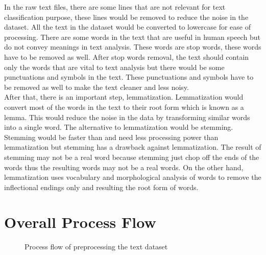 In the raw text files, there are some lines that are not relevant for text classification purpose, these lines would be removed to reduce the noise in the dataset. All the text in the dataset would be converted to lowercase for ease of processing. There are some words in the text that are useful in human speech but do not convey meanings in text analysis. These words are stop words, these words have to be removed as well. After stop words removal, the text should contain only the words that are vital to text analysis but there would be some punctuations and symbols in the text. These punctuations and symbols have to be removed as well to make the text cleaner and less noisy.\\

After that, there is an important step, lemmatization. Lemmatization would convert most of the words in the text to their root form which is known as a lemma. This would reduce the noise in the data by transforming similar words into a single word. The alternative to lemmatization would be stemming. Stemming would be faster than and need less processing power than lemmatization but stemming has a drawback against lemmatization. The result of stemming may not be a real word because stemming just chop off the ends of the words thus the resulting words may not be a real words. On the other hand, lemmatization uses vocabulary and morphological analysis of words to remove the inflectional endings only and resulting the root form of words. \cite{stemLemma}

\clearpage
\section{Overall Process Flow}
\begin{figure} [ht]
\centering
{}
\caption{Process flow of preprocessing the text dataset}
\label{fig: preprocessText}
\end{figure}

